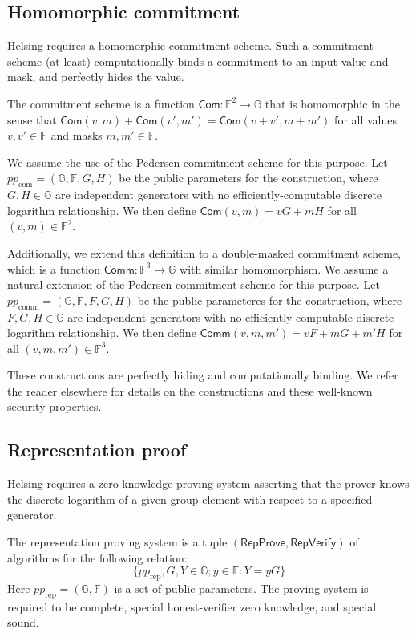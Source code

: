 \documentclass{article}
\newcommand{\G}{\mathbb{G}}
\newcommand{\F}{\mathbb{F}}
\newcommand{\func}[1]{\mathsf{#1}}
\newcommand{\com}{\func{Com}}
\newcommand{\comm}{\func{Comm}}
\theoremstyle{remark}
\begin{document}
\subsection{Homomorphic commitment}

Helsing requires a homomorphic commitment scheme.
Such a commitment scheme (at least) computationally binds a commitment to an input value and mask, and perfectly hides the value.

The commitment scheme is a function $\com: \F^2 \to \G$ that is homomorphic in the sense that $\com(v,m) + \com(v',m') = \com(v+v',m+m')$ for all values $v,v' \in \F$ and masks $m,m' \in \F$.

We assume the use of the Pedersen commitment scheme for this purpose.
Let $pp_{\text{com}} = (\G,\F,G,H)$ be the public parameters for the construction, where $G,H \in \G$ are independent generators with no efficiently-computable discrete logarithm relationship.
We then define $\com(v,m) = vG + mH$ for all $(v,m) \in \F^2$.

Additionally, we extend this definition to a double-masked commitment scheme, which is a function $\comm: \F^3 \to \G$ with similar homomorphism.
We assume a natural extension of the Pedersen commitment scheme for this purpose.
Let $pp_{\text{comm}} = (\G,\F,F,G,H)$ be the public parameteres for the construction, where $F,G,H \in \G$ are independent generators with no efficiently-computable discrete logarithm relationship.
We then define $\comm(v,m,m') = vF + mG + m'H$ for all $(v,m,m') \in \F^3$.

These constructions are perfectly hiding and computationally binding.
We refer the reader elsewhere for details on the constructions and these well-known security properties.


\subsection{Representation proof}

Helsing requires a zero-knowledge proving system asserting that the prover knows the discrete logarithm of a given group element with respect to a specified generator.

The representation proving system is a tuple $(\func{RepProve},\func{RepVerify})$ of algorithms for the following relation:
$$\{pp_{\text{rep}},G,Y \in \G ; y \in \F : Y = yG\}$$
Here $pp_{\text{rep}} = (\G,\F)$ is a set of public parameters.
The proving system is required to be complete, special honest-verifier zero knowledge, and special sound.
\end{document}
